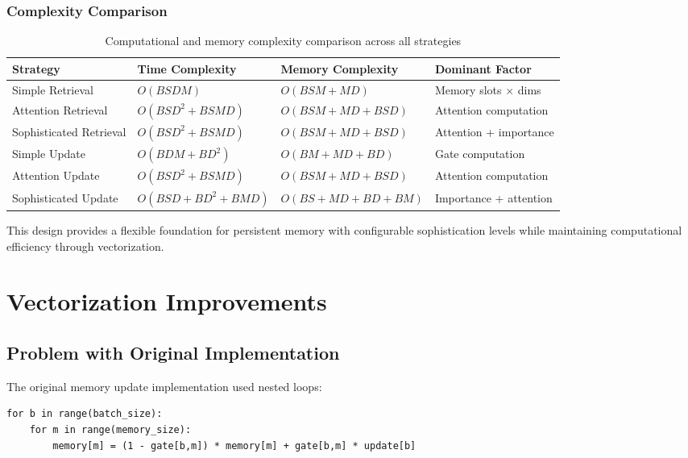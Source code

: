 \documentclass{article}
\begin{document}
\subsubsection{Complexity Comparison}

\begin{table}[h]
\centering
\small
{}
\begin{tabular}{|p{2.2cm}|p{3.5cm}|p{3.5cm}|p{2.8cm}|}
\hline
\textbf{Strategy} & \textbf{Time Complexity} & \textbf{Memory Complexity} & \textbf{Dominant Factor} \\
\hline
Simple Retrieval & $O(BSDM)$ & $O(BSM + MD)$ & Memory slots $\times$ dims \\
\hline
Attention Retrieval & $O(BSD^2 + BSMD)$ & $O(BSM + MD + BSD)$ & Attention computation \\
\hline
Sophisticated Retrieval & $O(BSD^2 + BSMD)$ & $O(BSM + MD + BSD)$ & Attention + importance \\
\hline
Simple Update & $O(BDM + BD^2)$ & $O(BM + MD + BD)$ & Gate computation \\
\hline
Attention Update & $O(BSD^2 + BSMD)$ & $O(BSM + MD + BSD)$ & Attention computation \\
\hline
Sophisticated Update & $O(BSD + BD^2 + BMD)$ & $O(BS + MD + BD + BM)$ & Importance + attention \\
\hline
\end{tabular}
\caption{Computational and memory complexity comparison across all strategies}
\end{table}

This design provides a flexible foundation for persistent memory with configurable sophistication levels while maintaining computational efficiency through vectorization.

\section{Vectorization Improvements}

\subsection{Problem with Original Implementation}

The original memory update implementation used nested loops:
\begin{verbatim}
for b in range(batch_size):
    for m in range(memory_size):
        memory[m] = (1 - gate[b,m]) * memory[m] + gate[b,m] * update[b]
\end{verbatim}
\end{document}
